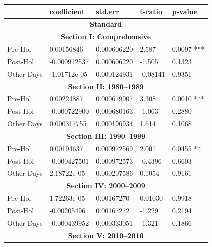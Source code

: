 \documentclass[11pt, english]{article}
\begin{document}
	\begin{center}
                \scriptsize
        \begin{longtable}{p{2cm}p{2cm}p{2cm}p{2cm}p{2cm}}
                & \textbf{coefficient} & \textbf{std.err} & \textbf{t-ratio} & \textbf{p-value}\\
                \hline
                \hline
                \multicolumn{5}{c}{\textbf{Standard}}\\
                \hline
                \hline
                \multicolumn{5}{c}{\textbf{Section I: Comprehensive}}\\
                \hline
                Pre-Hol & 0.00156846 & 0.000606220 & 2.587 & 0.0097 ***\\
                Post-Hol & -0.000912537 & 0.000606220 & -1.505 & 0.1323\\
                Other Days & -1.01712e-05 & 0.000124931 & -0.08141 & 0.9351\\
                \hline
                \multicolumn{5}{c}{\textbf{Section II: 1980--1989}}\\
                \hline            
                Pre-Hol & 0.00224887 & 0.000679907 & 3.308 & 0.0010 ***\\ 
                Post-Hol & -0.000722900 & 0.000680163 & -1.063 & 0.2880\\  
                Other Days & 0.000317755 & 0.000196934 & 1.614 & 0.1068\\
                \hline
		\multicolumn{5}{c}{\textbf{Section III: 1990--1999}}\\
                \hline            
		Pre-Hol & 0.00194637 & 0.000972569 & 2.001 & 0.0455 **\\ 
                Post-Hol & -0.000427501 & 0.000972573 & -0.4396 & 0.6603\\  
                Other Days & 2.18722e-05 & 0.000207586 & 0.1054 & 0.9161\\
                \hline
                \multicolumn{5}{c}{\textbf{Section IV: 2000--2009}}\\
                \hline            
                Pre-Hol & 1.72263e-05 & 0.00167270 & 0.01030 & 0.9918\\ 
                Post-Hol & -0.00205496 & 0.00167272 & -1.229 & 0.2194\\  
                Other Days & -0.000439952 & 0.000333051 & -1.321 & 0.1866\\
                \hline
                \multicolumn{5}{c}{\textbf{Section V: 2010--2016}}\\

\end{longtable}
\end{center}
\end{document}
